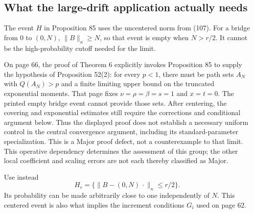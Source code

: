 \documentclass[10pt]{article}
\begin{document}
\subsection*{What the large-drift application actually needs}
The event \(H\) in Proposition 85 uses the uncentered norm from (107). For a bridge from \(0\) to \((0,N)\), \(\|B\|_\kappa\ge N\), so that event is empty when \(N>r/2\). It cannot be the high-probability cutoff needed for the limit.\par
On page 66, the proof of Theorem 6 explicitly invokes Proposition 85 to supply the hypothesis of Proposition 52(2): for every \(p<1\), there must be path sets \(A_N\) with \(Q(A_N)>p\) and a finite limiting upper bound on the truncated exponential moments. That page fixes \(\nu=\rho=\beta=s=1\) and \(x=t=0\). The printed empty bridge event cannot provide those sets. After centering, the covering and exponential estimates still require the corrections and conditional argument below. Thus the displayed proof does not establish a necessary uniform control in the central convergence argument, including its standard-parameter specialization. This is a Major proof defect, not a counterexample to that limit. This operative dependency determines the assessment of this group; the other local coefficient and scaling errors are not each thereby classified as Major.\par
Use instead \[H_r=\{\|B-(0,N)\,\cdot\|_\kappa\le r/2\}.\] Its probability can be made arbitrarily close to one independently of \(N\). This centered event is also what implies the increment conditions \(G_i\) used on page 62.\par
\end{document}
